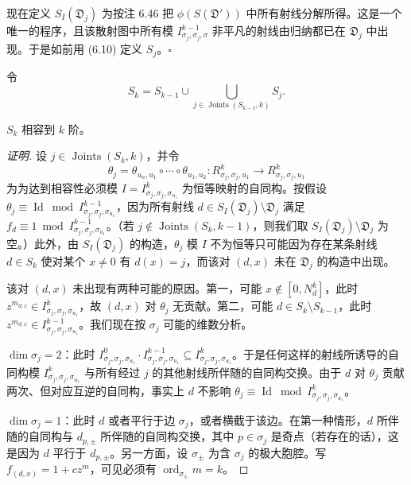 现在定义 $S_I(\mathfrak{D}_j)$ 为按注 6.46 把 $\phi(S(\mathfrak{D}'))$ 中所有射线分解所得。这是一个唯一的程序，且该散射图中所有模 $I_{\sigma_j,\sigma_j,\sigma}^{k-1}$ 非平凡的射线由归纳都已在 $\mathfrak{D}_j$ 中出现。于是如前用 (6.10) 定义 $S_j$。\hfill$\square$

令
\[
S_k=S_{k-1}\cup\bigcup_{j\in\operatorname{Joints}(S_{k-1},k)}S_j.
\]

\begin{theorem}
$S_k$ 相容到 $k$ 阶。
\end{theorem}

\begin{proof}[证明]
设 $j\in\operatorname{Joints}(S_k,k)$，并令
\[
\theta_j=\theta_{u_n,u_1}\circ\cdots\circ\theta_{u_1,u_2}:R_{\sigma_j,\sigma_j,u_1}^k\to R_{\sigma_j,\sigma_j,u_1}^k
\]
为为达到相容性必须模 $I=I_{\sigma_j,\sigma_j,\sigma_{u_1}}^k$ 为恒等映射的自同构。按假设 $\theta_j\equiv\operatorname{Id}\bmod I_{\sigma_j,\sigma_j,\sigma_{u_1}}^{k-1}$，因为所有射线 $d\in S_I(\mathfrak{D}_j)\setminus\mathfrak{D}_j$ 满足 $f_d\equiv1\bmod I_{\sigma_j,\sigma_j,\sigma_{u_1}}^{k-1}$。（若 $j\notin\operatorname{Joints}(S_k,k-1)$，则我们取 $S_I(\mathfrak{D}_j)\setminus\mathfrak{D}_j$ 为空。）此外，由 $S_I(\mathfrak{D}_j)$ 的构造，$\theta_j$ 模 $I$ 不为恒等只可能因为存在某条射线 $d\in S_k$ 使对某个 $x\ne0$ 有 $d(x)=j$，而该对 $(d,x)$ 未在 $\mathfrak{D}_j$ 的构造中出现。

该对 $(d,x)$ 未出现有两种可能的原因。第一，可能 $x\notin[0,N_d^k]$，此时 $z^{m_{d,x}}\in I_{\sigma_j,\sigma_j,\sigma_{u_1}}^k$，故 $(d,x)$ 对 $\theta_j$ 无贡献。第二，可能 $d\in S_k\setminus S_{k-1}$，此时 $z^{m_{d,x}}\in I_{\sigma_j,\sigma_j,\sigma_{u_1}}^{k-1}$。我们现在按 $\sigma_j$ 可能的维数分析。

$\dim\sigma_j=2$：此时 $I_{\sigma_j,\sigma_j,\sigma_{u_1}}^0\cdot I_{\sigma_j,\sigma_j,\sigma_{u_1}}^{k-1}\subseteq I_{\sigma_j,\sigma_j,\sigma_{u_1}}^k$。于是任何这样的射线所诱导的自同构模 $I_{\sigma_j,\sigma_j,\sigma_{u_1}}^k$ 与所有经过 $j$ 的其他射线所伴随的自同构交换。由于 $d$ 对 $\theta_j$ 贡献两次、但对应互逆的自同构，事实上 $d$ 不影响 $\theta_j\equiv\operatorname{Id}\bmod I_{\sigma_j,\sigma_j,\sigma_{u_1}}^k$。

$\dim\sigma_j=1$：此时 $d$ 或者平行于边 $\sigma_j$，或者横截于该边。在第一种情形，$d$ 所伴随的自同构与 $d_{p,\pm}$ 所伴随的自同构交换，其中 $p\in\sigma_j$ 是奇点（若存在的话），这是因为 $d$ 平行于 $d_{p,\pm}$。另一方面，设 $\sigma_\pm$ 为含 $\sigma_j$ 的极大胞腔。写 $f_{(d,x)}=1+cz^m$，可见必须有 $\operatorname{ord}_{\sigma_\pm}m=k$。


\end{proof}
